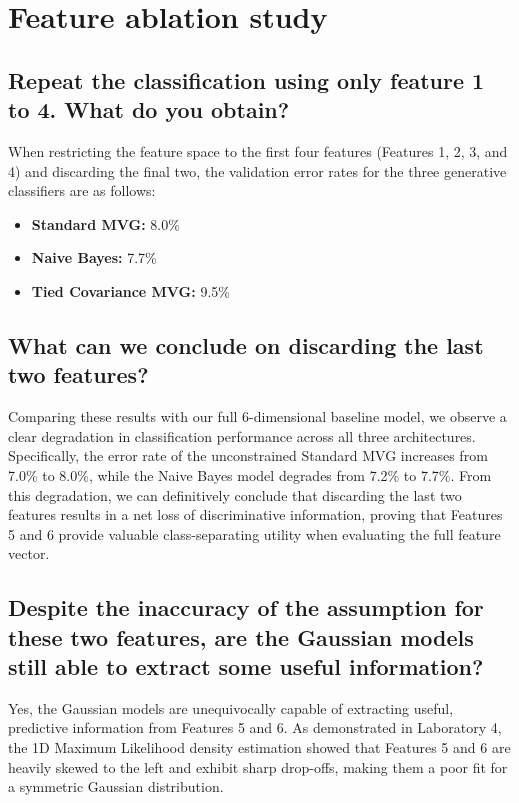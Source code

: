 \section{Feature ablation study}

\subsection*{Repeat the classification using only feature 1 to 4. What do you obtain?}

When restricting the feature space to the first four features (Features 1, 2, 3, and 4) and discarding the final two, the validation error rates for the three generative classifiers are as follows:
\begin{itemize}
    \item \textbf{Standard MVG:} 8.0\%
    \item \textbf{Naive Bayes:} 7.7\%
    \item \textbf{Tied Covariance MVG:} 9.5\%
\end{itemize}

\subsection*{What can we conclude on discarding the last two features?}

Comparing these results with our full 6-dimensional baseline model, we observe a clear degradation in classification performance across all three architectures. Specifically, the error rate of the unconstrained Standard MVG increases from 7.0\% to 8.0\%, while the Naive Bayes model degrades from 7.2\% to 7.7\%. From this degradation, we can definitively conclude that discarding the last two features results in a net loss of discriminative information, proving that Features 5 and 6 provide valuable class-separating utility when evaluating the full feature vector.

\subsection*{Despite the inaccuracy of the assumption for these two features, are the Gaussian models still able to extract some useful information?}

Yes, the Gaussian models are unequivocally capable of extracting useful, predictive information from Features 5 and 6. As demonstrated in Laboratory 4, the 1D Maximum Likelihood density estimation showed that Features 5 and 6 are heavily skewed to the left and exhibit sharp drop-offs, making them a poor fit for a symmetric Gaussian distribution. 

